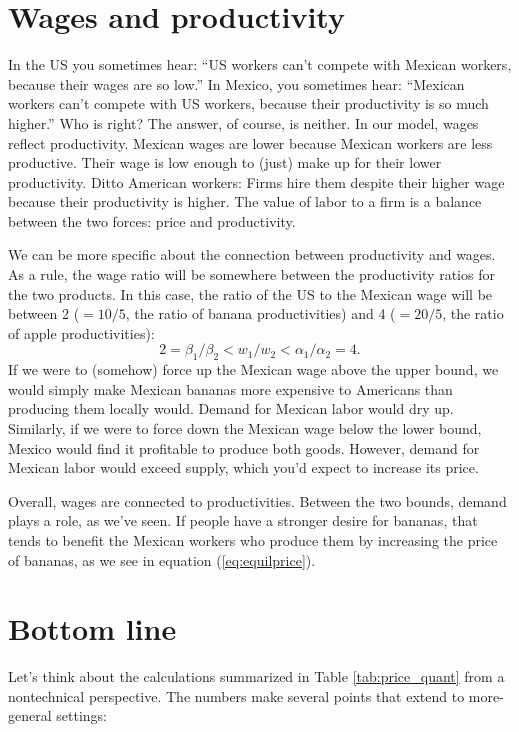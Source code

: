 \section{Wages and productivity}

In the US you sometimes hear:  ``US workers can't compete
with Mexican workers, because their wages are so low.''
In Mexico, you sometimes hear:
``Mexican workers can't compete with US workers,
because their productivity is so much higher.''
Who is right?
The answer, of course, is neither.
In our model, wages reflect productivity.
Mexican wages are lower because Mexican workers are less productive.
Their wage is low enough to (just) make up for their lower productivity.
Ditto American workers:  Firms hire them despite their higher wage
because their productivity is higher.
The value of labor to a firm is a balance between the two forces:
price and productivity.

We can be more specific about the connection between productivity
and wages.
As a rule, the wage ratio will be somewhere between
the productivity ratios for the two products.
In this case,
the ratio of the US to the Mexican wage will be between
2 ($=10/5$, the ratio of banana productivities)
and 4 ($=20/5$, the ratio of apple productivities):
\[
  2 = \beta_1/\beta_2   < w_1/w_2  < \alpha_1/\alpha_2 = 4.
\]
If we were to (somehow) force up the Mexican wage
above the upper bound, we would simply make Mexican bananas
more expensive to Americans than producing them locally would.
Demand for Mexican labor would dry up.
Similarly, if we were to force down the Mexican wage below
the lower bound, Mexico would find it profitable to produce
both goods.
However, demand for Mexican labor would exceed supply,
which you'd expect to increase its price.

Overall, wages are connected to productivities.
Between the two bounds, demand plays a role, as we've seen.
If people have a stronger desire for bananas, that tends
to benefit the Mexican workers who produce them
by increasing the price of bananas,
as we see in equation  (\ref{eq:equilprice}).


\section{Bottom line}

Let's think about the calculations summarized in
Table \ref{tab:price_quant} from a nontechnical perspective.
The numbers make several points that
extend to more-general settings:

